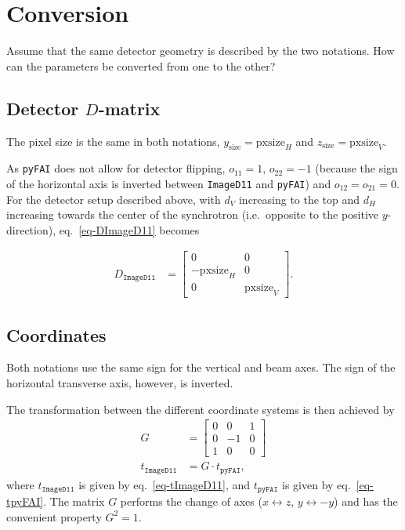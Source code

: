 \documentclass[12pt]{article}
\begin{document}
\section{Conversion}

Assume that the same detector geometry is described by the two
notations. How can the parameters be converted from one to the other?

\subsection{Detector $D$-matrix}

The pixel size is the same in both notations, $y_{\mathrm{size}} =
\mathrm{pxsize}_H$ and $z_{\mathrm{size}} = \mathrm{pxsize}_V$.

As \texttt{pyFAI} does not allow for detector flipping, $o_{11}=1$,
$o_{22}=-1$ (because the sign of the horizontal axis is inverted
between \texttt{ImageD11} and \texttt{pyFAI}) and $o_{12}=o_{21}=0$.
For the detector setup described above, with $d_V$ increasing to the
top and $d_H$ increasing towards the center of the synchrotron
(i.e.~opposite to the positive $y$-direction), eq.~\ref{eq-DImageD11}
becomes

\begin{align}
  D_{\mathtt{ImageD11}}
  & =
  \begin{bmatrix}
    0 & 0 \\ -\mathrm{pxsize}_H & 0 \\ 0 & \mathrm{pxsize}_V
  \end{bmatrix}.
  \label{eq-dmatrixImageD11}
\end{align}

\subsection{Coordinates}

Both notations use the same sign for the vertical and beam axes. The
sign of the horizontal transverse axis, however, is inverted.

The transformation between the different coordinate systems is then
achieved by
\begin{align}
  G & =
  \begin{bmatrix}
    0 & 0 & 1 \\ 0 & -1 & 0 \\ 1 & 0 & 0
  \end{bmatrix}
  \\
  t_{\mathtt{ImageD11}}
  & =
  G \cdot
  t_{\mathtt{pyFAI}},
  \label{eq-coordconv}
\end{align}
where $t_{\mathtt{ImageD11}}$ is given by eq.~\ref{eq-tImageD11}, and
$t_{\mathtt{pyFAI}}$ is given by eq.~\ref{eq-tpyFAI}. The matrix $G$
performs the change of axes ($x \leftrightarrow z$, $y \leftrightarrow
-y$) and has the convenient property $G^2 = 1$.
\end{document}
